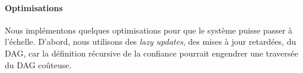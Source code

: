 \documentclass[letterpaper,twocolumn,10pt]{article}
\newcommand{\tronly}[2]{#1}
\theoremstyle{definition}
\begin{document}
%
%
%

\paragraph{Optimisations}
Nous implémentons quelques optimisations pour que le système puisse passer à l'échelle.
D'abord, nous utilisons des \emph{lazy updates}, des mises à jour retardées, du DAG, car la définition récursive de la confiance pourrait engendrer une traversée du DAG coûteuse.
\end{document}
